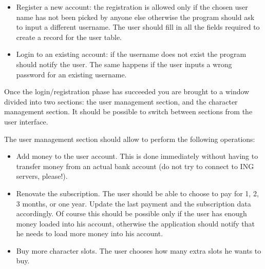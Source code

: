 \documentclass[10pt,a4paper]{article}
\begin{document}
\begin{itemize}
\item Register a new account: the registration is allowed only if the chosen user name has not been picked by anyone else otherwise the program should ask to input a different username. The user should fill in all the fields required to create a record for the user table.
\item Login to an existing account: if the username does not exist the program should notify the user. The same happens if the user inputs a wrong password for an existing username.
\end{itemize}

Once the login/registration phase has succeeded you are brought to a window divided into two sections: the user management section, and the character management section. It should be possible to switch between sections from the user interface.

The user management section should allow to perform the following operations:

\begin{itemize}
\item Add money to the user account. This is done immediately without having to transfer money from an actual bank account (do not try to connect to ING servers, please!).
\item Renovate the subscription. The user should be able to choose to pay for 1, 2, 3 months, or one year. Update the last payment and the subscription data accordingly. Of course this should be possible only if the user has enough money loaded into his account, otherwise the application should notify that he needs to load more money into his account.
\item Buy more character slots. The user chooses how many extra slots he wants to buy.
\end{itemize}
\end{document}
